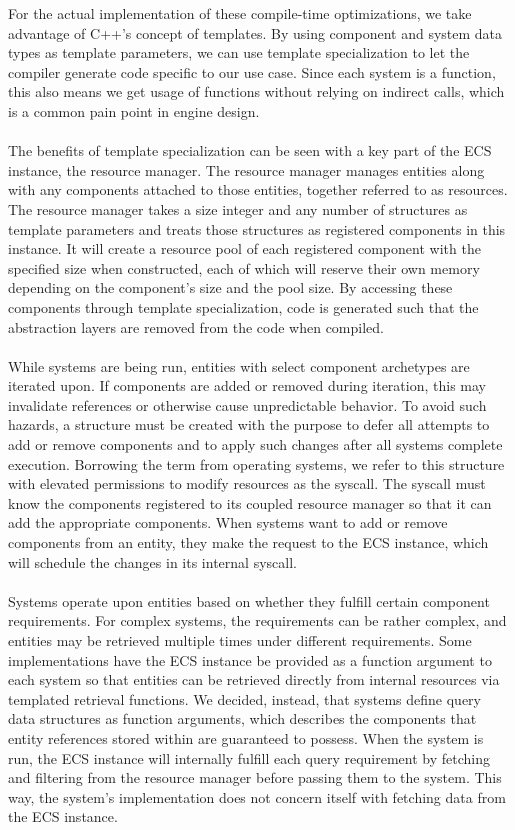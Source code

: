 For the actual implementation of these compile-time optimizations, we take advantage of C++'s concept of templates.
By using component and system data types as template parameters, we can use template specialization to let
the compiler generate code specific to our use case.
Since each system is a function, this also means we get usage of functions without relying on indirect calls,
which is a common pain point in engine design.
\\\\
The benefits of template specialization can be seen with a key part of the ECS instance, the resource manager.
The resource manager manages entities along with any components attached to those entities, together referred to as resources.
The resource manager takes a size integer and any number of structures as template parameters and treats those
structures as registered components in this instance.
It will create a resource pool of each registered component with the specified size when constructed, each of
which will reserve their own memory depending on the component's size and the pool size.
By accessing these components through template specialization, code is generated such that the abstraction layers
are removed from the code when compiled.
\\\\
While systems are being run, entities with select component archetypes are iterated upon.
If components are added or removed during iteration, this may invalidate references or otherwise cause unpredictable behavior.
To avoid such hazards, a structure must be created with the purpose to defer all attempts to add or remove components
and to apply such changes after all systems complete execution.
Borrowing the term from operating systems, we refer to this structure with elevated permissions to modify resources
as the syscall.
The syscall must know the components registered to its coupled resource manager so that it can add the appropriate
components.
When systems want to add or remove components from an entity, they make the request to the ECS instance, which
will schedule the changes in its internal syscall.
\\\\
Systems operate upon entities based on whether they fulfill certain component requirements.
For complex systems, the requirements can be rather complex, and entities may be retrieved multiple times
under different requirements.
Some implementations have the ECS instance be provided as a function argument to each system so that entities
can be retrieved directly from internal resources via templated retrieval functions.
We decided, instead, that systems define query data structures as function arguments, which describes the components
that entity references stored within are guaranteed to possess.
When the system is run, the ECS instance will internally fulfill each query requirement by fetching and filtering
from the resource manager before passing them to the system.
This way, the system's implementation does not concern itself with fetching data from the ECS instance.

